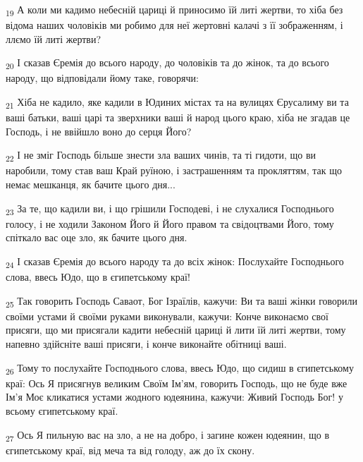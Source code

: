 \begin{tcolorbox}
\textsubscript{19} А коли ми кадимо небесній цариці й приносимо їй литі жертви, то хіба без відома наших чоловіків ми робимо для неї жертовні калачі з її зображенням, і ллємо їй литі жертви?
\end{tcolorbox}
\begin{tcolorbox}
\textsubscript{20} І сказав Єремія до всього народу, до чоловіків та до жінок, та до всього народу, що відповідали йому таке, говорячи:
\end{tcolorbox}
\begin{tcolorbox}
\textsubscript{21} Хіба не кадило, яке кадили в Юдиних містах та на вулицях Єрусалиму ви та ваші батьки, ваші царі та зверхники ваші й народ цього краю, хіба не згадав це Господь, і не ввійшло воно до серця Його?
\end{tcolorbox}
\begin{tcolorbox}
\textsubscript{22} І не зміг Господь більше знести зла ваших чинів, та ті гидоти, що ви наробили, тому став ваш Край руїною, і застрашенням та прокляттям, так що немає мешканця, як бачите цього дня...
\end{tcolorbox}
\begin{tcolorbox}
\textsubscript{23} За те, що кадили ви, і що грішили Господеві, і не слухалися Господнього голосу, і не ходили Законом Його й Його правом та свідоцтвами Його, тому спіткало вас оце зло, як бачите цього дня.
\end{tcolorbox}
\begin{tcolorbox}
\textsubscript{24} І сказав Єремія до всього народу та до всіх жінок: Послухайте Господнього слова, ввесь Юдо, що в єгипетському краї!
\end{tcolorbox}
\begin{tcolorbox}
\textsubscript{25} Так говорить Господь Саваот, Бог Ізраїлів, кажучи: Ви та ваші жінки говорили своїми устами й своїми руками виконували, кажучи: Конче виконаємо свої присяги, що ми присягали кадити небесній цариці й лити їй литі жертви, тому напевно здійсніте ваші присяги, і конче виконайте обітниці ваші.
\end{tcolorbox}
\begin{tcolorbox}
\textsubscript{26} Тому то послухайте Господнього слова, ввесь Юдо, що сидиш в єгипетському краї: Ось Я присягнув великим Своїм Ім'ям, говорить Господь, що не буде вже Ім'я Моє кликатися устами жодного юдеянина, кажучи: Живий Господь Бог! у всьому єгипетському краї.
\end{tcolorbox}
\begin{tcolorbox}
\textsubscript{27} Ось Я пильную вас на зло, а не на добро, і загине кожен юдеянин, що в єгипетському краї, від меча та від голоду, аж до їх скону.
\end{tcolorbox}
